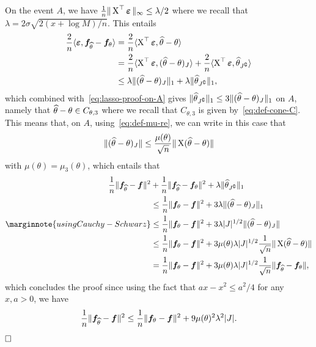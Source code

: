 On the event $A$,%
we have $\frac 1n \| \operatorname{{\boldsymbol X}}^\top \operatorname{\boldsymbol \varepsilon} \|_\infty \leq \lambda / 2$ where we recall that $\lambda = 2 \sigma \sqrt{2 (x + \log M) / n}$.
This entails 
\begin{align*}
	\frac 2n \langle \operatorname{\boldsymbol \varepsilon},  {\boldsymbol f}_{\widehat \theta} - {\boldsymbol f}_\theta \rangle &=
	\frac 2n \langle \operatorname{{\boldsymbol X}}^\top \operatorname{\boldsymbol \varepsilon}, \widehat \theta - \theta \rangle \\
	&= \frac 2n \langle \operatorname{{\boldsymbol X}}^\top \operatorname{\boldsymbol \varepsilon}, (\widehat \theta - \theta)_J \rangle 
	+ \frac 2n \langle \operatorname{{\boldsymbol X}}^\top \operatorname{\boldsymbol \varepsilon}, \widehat \theta_{J^\complement} \rangle \\
	&\leq \lambda \| (\widehat \theta - \theta)_J \|_1 
	+ \lambda \| \widehat \theta_{J^\complement} \|_1,
\end{align*}
which combined with~\eqref{eq:lasso-proof-on-A} gives $\| \widehat \theta_{J^\complement} \|_1 \leq 3 \| (\widehat \theta - \theta)_J \|_1$ on $A$, 
namely that $\widehat \theta - \theta \in C_{\theta, 3}$ where we recall that $C_{\theta, 3}$ is given by~\eqref{eq:def-cone-C}.
This means that, on $A$, using~\eqref{eq:def-mu-re}, we can write in this case that
\begin{equation*}
	\| (\widehat \theta - \theta)_J \| \leq \frac{\mu(\theta)}{\sqrt n} \| \operatorname{{\boldsymbol X}} (\widehat \theta - \theta) \|
\end{equation*}
with $\mu(\theta) = \mu_3(\theta)$, which entails that
\begin{align*}
	\frac 1n \norm{\bf_{\wh \theta} - \bf}^2 
	&+ \frac 1n \norm{\bf_{\wh \theta} - \bf_{\theta}}^2
	+ \lambda \norm{\wh \theta_{J^\complement}}_1 \\
	&\leq \frac 1n \norm{\bf_{\theta} - \bf}^2 
	+ 3 \lambda \norm{(\wh \theta - \theta)_J}_1 \\
	\marginnote{using Cauchy-Schwarz}
	&\leq \frac 1n \norm{\bf_{\theta} - \bf}^2 + 3 \lambda |J|^{1/2} \norm{(\wh \theta - \theta)_J} \\
	&\leq \frac 1n \norm{\bf_{\theta} - \bf}^2 + 3 \mu(\theta) \lambda |J|^{1/2} 
	\frac{1}{\sqrt n} \norm{\bX (\wh \theta - \theta)} \\
	&= \frac 1n \norm{\bf_{\theta} - \bf}^2 + 3 \mu(\theta) \lambda |J|^{1/2} 
	\frac{1}{\sqrt n} \norm{\bf_{\wh \theta} - \bf_\theta},
\end{align*}
which concludes the proof since using the fact that $ax - x^2 \leq a^2 / 4$ for any $x, a > 0$, we have
\begin{align*}
	\frac 1n \| {\boldsymbol f}_{\widehat \theta} - {\boldsymbol f} \|^2 
	\leq \frac 1n \| {\boldsymbol f}_{\theta} - {\boldsymbol f} \|^2 + 9 \mu(\theta)^2 \lambda^2 |J|.
\end{align*}
$\hfill \square$

